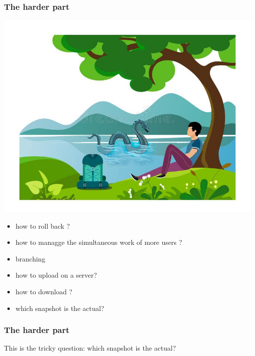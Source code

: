 \documentclass[aspectratio=169]{beamer}
\begin{document}
\begin{frame}
\frametitle<presentation>{The harder part}
  
\noindent\begin{minipage}{0.6\textwidth}%
\includegraphics[width=\linewidth]{pictures/resting-under-tree+nessie.png}
\end{minipage}%
\hfill%
\begin{minipage}{0.4\textwidth}\raggedleft
\begin{itemize}
    \item how to roll back ?
    \item how to managge the simultaneous work of more users ?
	\item branching
	\item how to upload on a server?
	\item how to download ?
	\item which snapshot is the actual?
	\end{itemize}
\end{minipage}
  
\end{frame}



\begin{frame}
\frametitle<presentation>{The harder part}
  
  \begin{block}{This is the tricky question:}
  	which snapshot is the actual?
  \end{block}

  
\end{frame}
\end{document}
